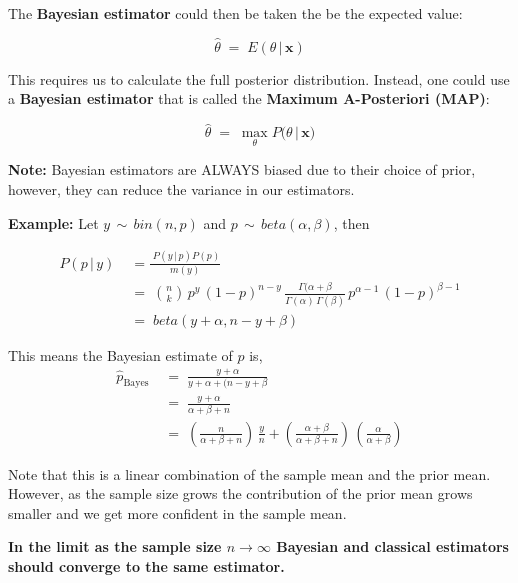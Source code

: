 \documentclass[10pt]{article}
\numberwithin{equation}{section}
\begin{document}
The \textbf{Bayesian estimator} could then be taken the be the expected value:
 
 $$ \widehat{\theta} \; = \; E(\theta \, \vert \, \textbf{x})$$
 
 \noindent
This requires us to calculate the full posterior distribution. Instead, one could use a \textbf{Bayesian estimator} that is called the \textbf{Maximum A-Posteriori (MAP)}:
 
  $$ \widehat{\theta} \; = \; \max_{\theta} P(\theta \, \vert \, \textbf{x)}$$
  
 \noindent
\textbf{Note:} Bayesian estimators are ALWAYS biased due to their choice of prior, however, they can reduce the variance in our estimators.


\vspace{2mm}

\noindent
\textbf{Example:}
Let $y \, \sim \, bin(n,p)$ and $p \, \sim \, beta(\alpha, \beta)$, then 

\begin{align}
P(p \, \vert \, y ) \; &= \frac{ \; P(y \, \vert \, p) P(p) }{m(y)} \\
 &= \; \binom{n}{k} \, p^{y} \, (1-p)^{n-y} \, \frac{\Gamma(\alpha + \beta}{\Gamma(\alpha) \, \Gamma(\beta) } \, p^{
 \alpha-1} \, (1-p)^{\beta -1} \\
&= \; beta(y + \alpha, n- y+ \beta) 
 \end{align}
 
 \noindent
 This means the Bayesian estimate of $p$ is,
 \begin{align}
 \widehat{p}_{\text{Bayes}} \; &= \; \frac{y + \alpha}{y + \alpha + (n - y + \beta} \\
 &= \; \frac{y + \alpha}{\alpha + \beta + n} \\
 &= \; \left( \frac{n}{\alpha + \beta + n } \right) \, \frac{y}{n} + \left( \frac{ \alpha + \beta }{\alpha + \beta + n} \right) \,  \left(\frac{\alpha}{\alpha + \beta}\right)
\end{align}

\noindent
Note that this is a linear combination of the sample mean and the prior mean.  However, as the sample size grows the contribution of the prior mean grows smaller and we get more confident in the sample mean.

\vspace{2mm}

\textbf{In the limit as the sample size $n \rightarrow \infty$ Bayesian and classical estimators should converge to the same estimator.}  
\end{document}
